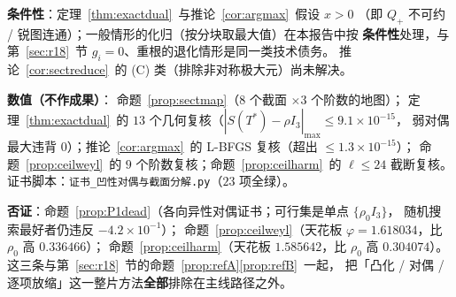 \textbf{条件性}：定理~\ref{thm:exactdual}~与推论~\ref{cor:argmax}~假设 $x>0$
（即 $Q_+$ 不可约 / 锐图连通）；一般情形的化归（按分块取最大值）在本报告中按
\textbf{条件性}处理，与第~\ref{sec:r18}~节 $g_i=0$、重根的退化情形是同一类技术债务。
推论~\ref{cor:sectreduce}~的 (C) 类（排除非对称极大元）尚未解决。

\textbf{数值（不作成果）}：
命题~\ref{prop:sectmap}（$8$ 个截面 $\times3$ 个阶数的地图）；
定理~\ref{thm:exactdual}~的 $13$ 个几何复核（$|S(T^*)-\rho I_3|_{\max}\le9.1\times10^{-15}$，
弱对偶最大违背 $0$）；推论~\ref{cor:argmax}~的 L-BFGS 复核（超出 $\le1.3\times10^{-15}$）；
命题~\ref{prop:ceilweyl}~的 $9$ 个阶数复核；命题~\ref{prop:ceilharm}~的 $\ell\le24$ 截断复核。
证书脚本：\texttt{证书\_凹性对偶与截面分解.py}（$23$ 项全绿）。

\textbf{否证}：命题~\ref{prop:P1dead}（各向异性对偶证书；可行集是单点 $\{\rho_0I_3\}$，
随机搜索最好者仍违反 $-4.2\times10^{-1}$）；
命题~\ref{prop:ceilweyl}（天花板 $\varphi=1.618034$，比 $\rho_0$ 高 $0.336466$）；
命题~\ref{prop:ceilharm}（天花板 $1.585642$，比 $\rho_0$ 高 $0.304074$）。
这三条与第~\ref{sec:r18}~节的命题~\ref{prop:refA}\ref{prop:refB}~一起，
把「凸化 / 对偶 / 逐项放缩」这一整片方法\textbf{全部}排除在主线路径之外。

